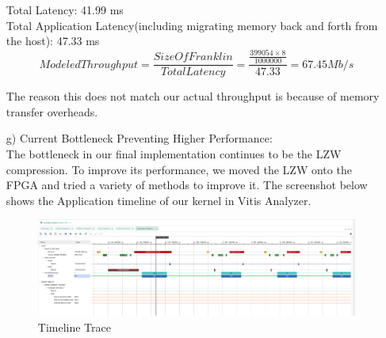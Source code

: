 \documentclass[../main.tex]{subfiles}
\begin{document}
\begin{enumerate}
    Total Latency: 41.99 ms \\
    
    Total Application Latency(including migrating memory back and forth from the host): 47.33 ms \\
    $$
    ModeledThroughput = \frac{SizeOfFranklin}{TotalLatency} = \frac{\frac{399054 \times 8}{1000000}}{47.33} = 67.45 Mb/s
    $$
    
    The reason this does not match our actual throughput is because of memory transfer overheads.


    \item[g)] Current Bottleneck Preventing Higher Performance: \\
    The bottleneck in our final implementation continues to be the LZW compression. To improve its performance, we moved the LZW onto the FPGA and tried a variety of methods to improve it. The screenshot below shows the Application timeline of our kernel in Vitis Analyzer.

    \begin{figure}[H]
        \centering
        \includegraphics[width=0.8\linewidth]{Images/image13.png}
        \caption{Timeline Trace}
        \label{fig:timeline}
    \end{figure}
 
\end{enumerate}
\end{document}
